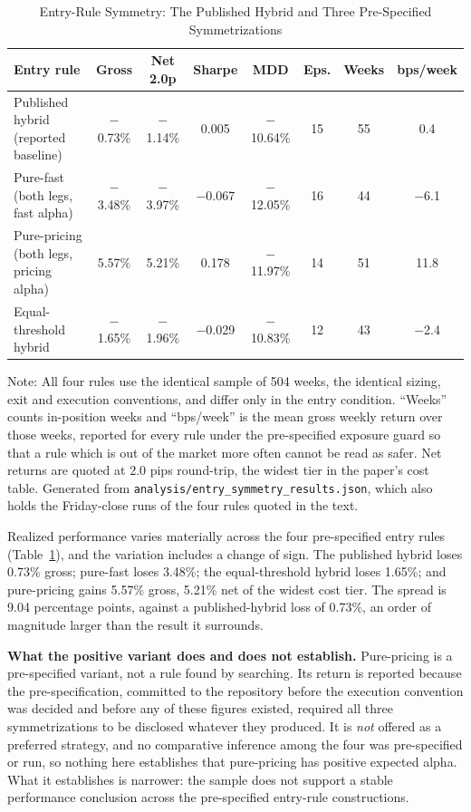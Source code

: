 \documentclass[11pt]{article}
\begin{document}
\begin{table}[H]
\centering
\caption{Entry-Rule Symmetry: The Published Hybrid and Three Pre-Specified Symmetrizations}
\label{tab:entrysymmetry}
\footnotesize
\begin{tabular}{@{}lccccccc@{}}
\toprule
Entry rule & Gross & Net 2.0p & Sharpe & MDD & Eps. & Weeks & bps/week \\
\midrule
Published hybrid (reported baseline) & $-$0.73\% & $-$1.14\% & 0.005 & $-$10.64\% & 15 & 55 & 0.4 \\
Pure-fast (both legs, fast alpha) & $-$3.48\% & $-$3.97\% & $-$0.067 & $-$12.05\% & 16 & 44 & $-$6.1 \\
Pure-pricing (both legs, pricing alpha) & 5.57\% & 5.21\% & 0.178 & $-$11.97\% & 14 & 51 & 11.8 \\
Equal-threshold hybrid & $-$1.65\% & $-$1.96\% & $-$0.029 & $-$10.83\% & 12 & 43 & $-$2.4 \\
\bottomrule
\end{tabular}
\par\vspace{0.3em}
\parbox{\linewidth}{\footnotesize Note: All four rules use the identical sample of 504 weeks, the identical sizing, exit and execution conventions, and differ only in the entry condition. ``Weeks'' counts in-position weeks and ``bps/week'' is the mean gross weekly return over those weeks, reported for every rule under the pre-specified exposure guard so that a rule which is out of the market more often cannot be read as safer. Net returns are quoted at 2.0 pips round-trip, the widest tier in the paper's cost table. Generated from \texttt{analysis/entry\_symmetry\_results.json}, which also holds the Friday-close runs of the four rules quoted in the text.}
\end{table}

Realized performance varies materially across the four pre-specified entry rules (Table~\ref{tab:entrysymmetry}), and the variation includes a change of sign. The published hybrid loses 0.73\% gross; pure-fast loses 3.48\%; the equal-threshold hybrid loses 1.65\%; and pure-pricing gains 5.57\% gross, 5.21\% net of the widest cost tier. The spread is 9.04 percentage points, against a published-hybrid loss of 0.73\%, an order of magnitude larger than the result it surrounds.

\textbf{What the positive variant does and does not establish.} Pure-pricing is a pre-specified variant, not a rule found by searching. Its return is reported because the pre-specification, committed to the repository before the execution convention was decided and before any of these figures existed, required all three symmetrizations to be disclosed whatever they produced. It is \emph{not} offered as a preferred strategy, and no comparative inference among the four was pre-specified or run, so nothing here establishes that pure-pricing has positive expected alpha. What it establishes is narrower: the sample does not support a stable performance conclusion across the pre-specified entry-rule constructions.
\end{document}

